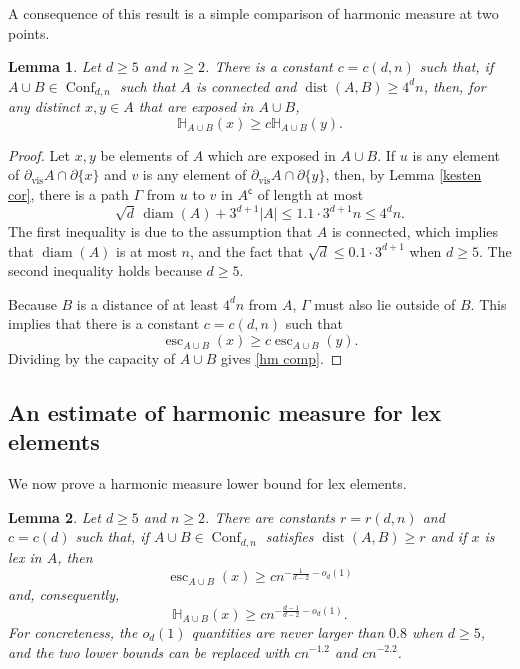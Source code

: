 \documentclass[11pt,reqno]{amsart}
\newtheorem{lemma}{Lemma}[section]
\theoremstyle{definition}
\numberwithin{equation}{section}
\newcommand{\1}{\mathbf{1}}
\renewcommand{\H}{\mathbb{H}}
\newcommand{\bdy}{\partial}
\DeclareMathOperator{\dist}{dist}
\DeclareMathOperator{\diam}{diam}
\newcommand{\bdyvis}{\partial_{\mathrm{vis}}}
\newcommand{\cc}{\mathsf{c}}
\DeclareMathOperator{\Es}{esc}
\DeclareMathOperator{\Conf}{\mathrm{Conf}}
\begin{document}
A consequence of this result is a simple comparison of harmonic measure at two points.

\begin{lemma}\label{lem hm comp}
Let $d \geq 5$ and $n \geq 2$. There is a constant $c = c(d,n)$ such that, if $A \cup B \in \Conf_{d,n}$ such that $A$ is connected and $\dist (A,B) \geq 4^d n$, then, for any distinct $x, y \in A$ that are exposed in $A \cup B$,
\begin{equation}\label{hm comp}
\H_{A \cup B} (x) \geq c \H_{A \cup B} (y).
\end{equation}
\end{lemma}

\begin{proof}
Let $x, y$ be elements of $A$ which are exposed in $A \cup B$. If $u$ is any element of $\bdyvis A \cap \bdy \{x\}$ and $v$ is any element of $\bdyvis A \cap \bdy \{y\}$, then, by Lemma \ref{kesten cor}, there is a path $\Gamma$ from $u$ to $v$ in $A^\cc$ of length at most
\[ \sqrt{d} \, \diam (A) + 3^{d+1} |A| \leq 1.1 \cdot 3^{d+1} n \leq 4^d n.\]
The first inequality is due to the assumption that $A$ is connected, which implies that $\diam (A)$ is at most $n$, and the fact that $\sqrt{d} \leq 0.1 \cdot 3^{d+1}$ when $d \geq 5$. The second inequality holds because $d \geq 5$.

Because $B$ is a distance of at least $4^d n$ from $A$, $\Gamma$ must also lie outside of $B$. This implies that there is a constant $c = c(d,n)$ such that
\[ \Es_{A \cup B} (x) \geq c \Es_{A \cup B} (y).\]
Dividing by the capacity of $A \cup B$ gives \eqref{hm comp}.
\end{proof}

\subsection{An estimate of harmonic measure for lex elements}\label{sec lex}

We now prove a harmonic measure lower bound for lex elements. 

\begin{lemma}\label{lex hm}
Let $d \geq 5$ and $n \geq 2$. There are constants $r = r (d,n)$ and $c = c(d)$ such that, if $A \cup B \in \Conf_{d,n}$ satisfies $\dist (A,B) \geq r$ and if $x$ is lex in $A$, then
\begin{equation}\label{lex hm bd1}
\Es_{A \cup B} (x) \geq  c n^{-\frac{1}{d-2}-o_d(1)} 
\end{equation}
and, consequently,
\begin{equation}\label{lex hm bd2}
\H_{A \cup B} (x) \geq c n^{-\frac{d-1}{d-2}-o_d(1)}.
\end{equation}
For concreteness, the $o_d (1)$ quantities are never larger than $0.8$ when $d \geq 5$, and the two lower bounds can be replaced with $cn^{-1.2}$ and $c n^{-2.2}$. 
\end{lemma}
\end{document}
